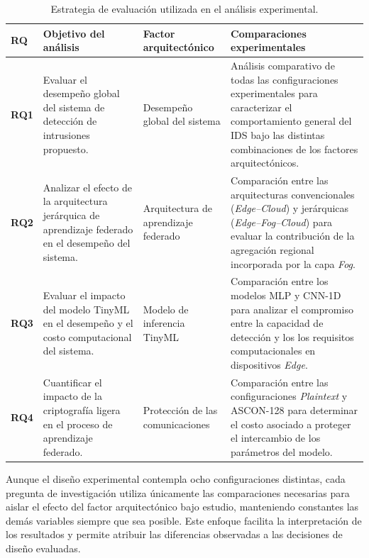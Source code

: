 \documentclass[journal,article,submit,moreauthors]{Definitions/mdpi}
\begin{document}
\begin{table}[ht]
\centering
\caption{Estrategia de evaluación utilizada en el análisis experimental.}
\label{tab:evaluation_strategy}
\footnotesize

\begin{tabularx}{\textwidth}{l p{3.5cm} p{3.5cm} X}
\toprule
\textbf{RQ} &
\textbf{Objetivo del análisis} &
\textbf{Factor arquitectónico} &
\textbf{Comparaciones experimentales} \\
\midrule

\textbf{RQ1} &
Evaluar el desempeño global del sistema de detección de intrusiones propuesto. &
Desempeño global del sistema &
Análisis comparativo de todas las configuraciones experimentales para caracterizar el comportamiento general del IDS bajo las distintas combinaciones de los factores arquitectónicos. \\

\textbf{RQ2} &
Analizar el efecto de la arquitectura jerárquica de aprendizaje federado en el desempeño del sistema. &
Arquitectura de aprendizaje federado &
Comparación entre las arquitecturas convencionales (\textit{Edge--Cloud}) y jerárquicas (\textit{Edge--Fog--Cloud}) para evaluar la contribución de la agregación regional incorporada por la capa \textit{Fog}. \\

\textbf{RQ3} &
Evaluar el impacto del modelo TinyML en el desempeño y el costo computacional del sistema. &
Modelo de inferencia TinyML &
Comparación entre los modelos MLP y CNN-1D para analizar el compromiso entre la capacidad de detección y los los requisitos computacionales en dispositivos \textit{Edge}. \\

\textbf{RQ4} &
Cuantificar el impacto de la criptografía ligera en el proceso de aprendizaje federado. &
Protección de las comunicaciones &
Comparación entre las configuraciones \textit{Plaintext} y ASCON-128 para determinar el costo asociado a proteger el intercambio de los parámetros del modelo. \\

\bottomrule
\end{tabularx}

\end{table}

Aunque el diseño experimental contempla ocho configuraciones distintas, cada pregunta de investigación utiliza únicamente las comparaciones necesarias para aislar el efecto del factor arquitectónico bajo estudio, manteniendo constantes las demás variables siempre que sea posible. Este enfoque facilita la interpretación de los resultados y permite atribuir las diferencias observadas a las decisiones de diseño evaluadas.
\end{document}
